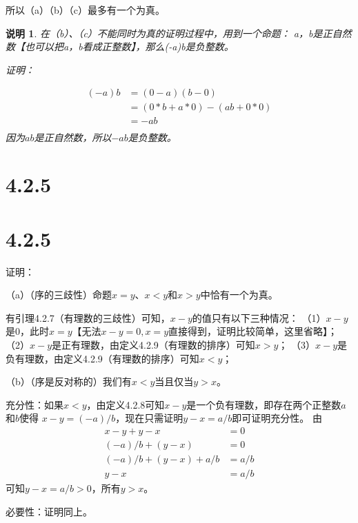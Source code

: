 \documentclass{article}
\theoremstyle{mystyle}
\newtheorem*{zremark}{说明}
\begin{document}
所以（a）（b）（c）最多有一个为真。

\begin{zgraytheorem}
  \begin{zremark}
    在（b）、（c）不能同时为真的证明过程中，用到一个命题：
    a，b是正自然数【也可以把a，b看成正整数】，那么(-a)b是负整数。

    证明：

    \begin{align*}
      (-a)b & = (0-a)(b-0)               \\
            & = (0*b + a*0) - (ab + 0*0) \\
            & = -ab                      \\
    \end{align*}
    因为$ab$是正自然数，所以$-ab$是负整数。
  \end{zremark}
\end{zgraytheorem}
\section*{4.2.5}

\section*{4.2.5}

证明：

（a）（序的三歧性）命题$x = y$、$x < y$和$x > y$中恰有一个为真。

有引理4.2.7（有理数的三歧性）可知，$x-y$的值只有以下三种情况：
（1）$x-y$是0，此时$x = y$【无法$x-y=0,x=y$直接得到，证明比较简单，这里省略】；
（2）$x-y$是正有理数，由定义4.2.9（有理数的排序）可知$x > y$；
（3）$x-y$是负有理数，由定义4.2.9（有理数的排序）可知$x < y$；

（b）（序是反对称的）我们有$x < y$当且仅当$y > x$。

充分性：如果$x<y$，由定义4.2.8可知$x-y$是一个负有理数，即存在两个正整数$a$和$b$使得
$x - y = (-a) / b$，现在只需证明$y - x = a / b$即可证明充分性。
由
\begin{align*}
  x - y + y - x              & = 0     \\
  (-a) / b + (y - x)         & = 0     \\
  (-a) / b + (y - x) + a / b & = a / b \\
  y - x                      & = a / b
\end{align*}
可知$y - x = a / b > 0$，所有$y > x$。

必要性：证明同上。
\end{document}

